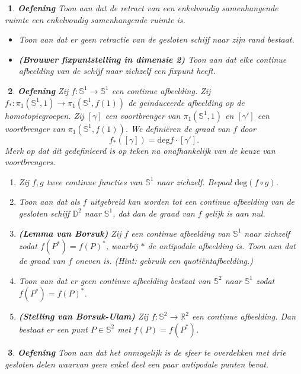 \documentclass[12pt]{book}
\newcommand{\R}{\mathbb{R}}
\newtheorem{eoef}{$\!\!$}[chapter]
\newenvironment{oef}{\begin{eoef} {\bf Oefening}}{\end{eoef}}
\begin{document}
\begin{oef}
Toon aan dat de retract van een enkelvoudig samenhangende ruimte een enkelvoudig samenhangende ruimte is.
\item
\begin{itemize}
\item
Toon aan dat er geen retractie van de gesloten schijf naar zijn rand bestaat.
\item
\textbf{(Brouwer fixpuntstelling in dimensie 2)} Toon aan dat elke continue afbeelding van de schijf naar zichzelf een fixpunt heeft.
\end{itemize}

\end{oef}
\begin{oef}
Zij $f : \mathbb{S}^1 \rightarrow \mathbb{S}^1$ een continue afbeelding. Zij $f_* : \pi_1(\mathbb{S}^1,1) \rightarrow \pi_1(\mathbb{S}^1,f(1))$ de geinduceerde afbeelding op de homotopiegroepen. Zij $[\gamma]$ een voortbrenger van  $\pi_1(\mathbb{S}^1,1)$ en $[\gamma']$ een voortbrenger van $ \pi_1(\mathbb{S}^1,f(1))$. We defini\"eren de {\em graad} van $f$ door 
\[
f_*([\gamma]) = \mathrm{deg} f \cdot [\gamma'] .
\] 
Merk op dat dit gedefinieerd is op teken na onafhankelijk van de keuze van voortbrengers.

\begin{enumerate}
\item
Zij $f,g$ twee continue functies van $\mathbb{S}^1$ naar zichzelf. Bepaal $\mathrm{deg} (f \circ g)$.
\item

Toon aan dat als $f$ uitgebreid kan worden tot een continue afbeelding van de gesloten schijf $\mathbb{D}^2$ naar $\mathbb{S}^1$, dat dan de graad van $f$ gelijk is aan nul. 
\item
\textbf{(Lemma van Borsuk)} Zij $f$ een continue afbeelding van $\mathbb{S}^1$ naar zichzelf zodat $f(P^*) =f(P)^*$, waarbij $*$ de antipodale afbeelding is. Toon aan dat de graad van $f$ oneven is. (Hint: gebruik een quoti\"entafbeelding.)
\item
Toon aan dat er geen continue afbeelding bestaat van $\mathbb{S}^2$ naar $\mathbb{S}^1$ zodat $f(P^*) =f(P)^*$.
\item \textbf{(Stelling van Borsuk-Ulam)} 
Zij $f: \mathbb{S}^2 \rightarrow \R^2$ een continue afbeelding. Dan bestaat er een punt $P \in \mathbb{S}^2$ met $f(P)= f(P^*)$.  


\end{enumerate}

\end{oef}
\begin{oef}
Toon aan dat het onmogelijk is de sfeer te overdekken met drie gesloten delen waarvan geen enkel deel een paar antipodale punten bevat.
\end{oef}
\end{document}

